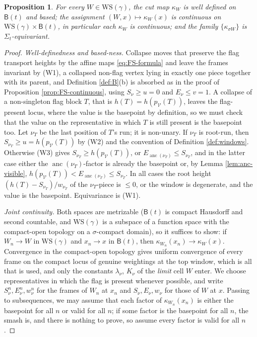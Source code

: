 \documentclass[12pt]{amsart}
\newtheorem{proposition}[subsection]{Proposition}
\theoremstyle{definition}
\theoremstyle{remark}
\newcommand{\Cal}[1]{\mathcal{#1}}
\newcommand{\BC}{\mathsf{B}}                     %
\newcommand{\anc}{\operatorname{anc}}            %
\begin{document}
\begin{proposition}\label{prop:K-continuity}
For every $W\in\mathrm{WS}(\gamma)$, the cut map $\kappa_W$ is well defined on $\BC(t)$ and based; the assignment $(W,x)\mapsto\kappa_W(x)$ is continuous on $\mathrm{WS}(\gamma)\times\BC(t)$, in particular each $\kappa_W$ is continuous; and the family $\{\kappa_{\sigma W}\}$ is $\Sigma_t$-equivariant.
\end{proposition}

\begin{proof}
\emph{Well-definedness and based-ness.} Collapse moves that preserve the flag transport heights by the affine maps \eqref{eq:FS-formula} and leave the frames invariant by (W1), a collapsed non-flag vertex lying in exactly one piece together with its parent, and Definition \ref{def:B}(b) is absorbed as in the proof of Proposition \ref{prop:FS-continuous}, using $S_\nu\geq u = 0$ and $E_\nu\leq v = 1$. A collapse of a non-singleton flag block $T$, that is $h(T) = h(p_{\Cal V}(T))$, leaves the flag-present locus, where the value is the basepoint by definition, so we must check that the value on the representative in which $T$ is still present is the basepoint too. Let $\nu_T$ be the last position of $T$'s run; it is non-unary. If $\nu_T$ is root-run, then $S_{\nu_T}\geq u = h(p_{\Cal V}(T))$ by (W2) and the convention of Definition \ref{def:windows}. Otherwise (W3) gives $S_{\nu_T}\geq h(p_{\Cal V}(T))$, or $E_{\anc(\nu_T)}\leq S_{\nu_T}$, and in the latter case either the $\anc(\nu_T)$-factor is already the basepoint or, by Lemma \ref{lem:anc-visible}, $h(p_{\Cal V}(T)) < E_{\anc(\nu_T)}\leq S_{\nu_T}$. In all cases the root height $(h(T) - S_{\nu_T})/w_{\nu_T}$ of the $\nu_T$-piece is $\leq 0$, or the window is degenerate, and the value is the basepoint. Equivariance is (W1).

\emph{Joint continuity.} Both spaces are metrizable ($\BC(t)$ is compact Hausdorff and second countable, and $\mathrm{WS}(\gamma)$ is a subspace of a function space with the compact-open topology on a $\sigma$-compact domain), so it suffices to show: if $W_n\to W$ in $\mathrm{WS}(\gamma)$ and $x_n\to x$ in $\BC(t)$, then $\kappa_{W_n}(x_n)\to\kappa_W(x)$. Convergence in the compact-open topology gives uniform convergence of every frame on the compact locus of genuine weightings at the top window, which is all that is used, and only the constants $\lambda_\nu$, $K_\nu$ of the \emph{limit} cell $W$ enter. We choose representatives in which the flag is present whenever possible, and write $S^n_\nu, E^n_\nu, w^n_\nu$ for the frames of $W_n$ at $x_n$ and $S_\nu, E_\nu, w_\nu$ for those of $W$ at $x$. Passing to subsequences, we may assume that each factor of $\kappa_{W_n}(x_n)$ is either the basepoint for all $n$ or valid for all $n$; if some factor is the basepoint for all $n$, the smash is, and there is nothing to prove, so assume every factor is valid for all $n$.


\end{proof}
\end{document}
